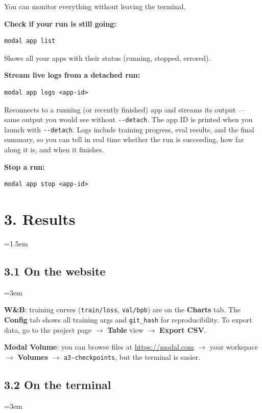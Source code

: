 \documentclass[9pt]{extarticle}
\newcommand{\cmd}[1]{\colorbox{gray!10}{\texttt{#1}}}
\begin{document}
You can monitor everything without leaving the terminal.

\textbf{Check if your run is still going:}

\begin{lstlisting}
modal app list
\end{lstlisting}

Shows all your apps with their status (running, stopped, errored).

\textbf{Stream live logs from a detached run:}

\begin{lstlisting}
modal app logs <app-id>
\end{lstlisting}

Reconnects to a running (or recently finished) app and streams its output --- same output you would see without \cmd{-{}-detach}. The app ID is printed when you launch with \cmd{-{}-detach}. Logs include training progress, eval results, and the final summary, so you can tell in real time whether the run is succeeding, how far along it is, and when it finishes.

\textbf{Stop a run:}

\begin{lstlisting}
modal app stop <app-id>
\end{lstlisting}

\leftskip=0pt
\section*{3. Results}
\leftskip=1.5em

\subsection*{3.1 On the website}
\leftskip=3em

\textbf{W\&B}: training curves (\cmd{train/loss}, \cmd{val/bpb}) are on the \textbf{Charts} tab. The \textbf{Config} tab shows all training args and \cmd{git\_hash} for reproducibility. To export data, go to the project page $\to$ \textbf{Table} view $\to$ \textbf{Export CSV}.

\textbf{Modal Volume}: you can browse files at \url{https://modal.com} $\to$ your workspace $\to$ \textbf{Volumes} $\to$ \cmd{a3-checkpoints}, but the terminal is easier.

\subsection*{3.2 On the terminal}
\leftskip=3em
\end{document}
